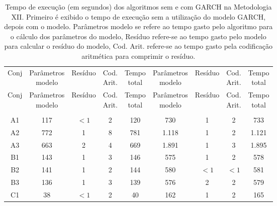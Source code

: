 \begin{center}
\begin{longtable}{ccccc|cccc}
\toprule
\rowcolor{white}
\caption[Metodologia XII: tempo de execução]{Tempo de execução (em segundos)
dos algoritmos sem e com GARCH na Metodologia XII. Primeiro é exibido o tempo de
execução sem a utilização do modelo GARCH, depois com o modelo. Parâmetros
modelo se refere ao tempo gasto pelo algoritmo para o cálculo dos parâmetros do
modelo, Resíduo refere-se ao tempo gasto pelo modelo para calcular o resíduo do
modelo, Cod. Arit. refere-se ao tempo gasto pela codificação aritmética para
comprimir o resíduo.} \label{tab:EvolucaoEntropiaMet12}\\
\midrule
Conj & \specialcell{Parâmetros\\modelo} &
Resíduo & \specialcell{Cod.\\Arit.} & \specialcell{Tempo\\total} &
\specialcell{Parâmetros\\modelo} &
Resíduo & \specialcell{Cod.\\Arit.} & \specialcell{Tempo\\total} \\
\midrule
\endfirsthead 
\midrule
\rowcolor{white}
Conj & \specialcell{Parâmetros\\modelo} &
Resíduo & \specialcell{Cod.\\Arit.} & \specialcell{Tempo\\total} &
\specialcell{Parâmetros\\modelo} &
Resíduo & \specialcell{Cod.\\Arit.} & \specialcell{Tempo\\total} \\
\toprule
\endhead
\midrule \\ %
\endfoot
\bottomrule 
\endlastfoot
A1&117&$<1$&2&120&730&1&2&733\\
A2&772&1&8&781&1.118&1&2&1.121\\
A3&663&2&4&669&1.891&1&3&1.895\\
B1&143&1&3&146&575&1&2&578\\
B2&141&1&2&144&580&$<1$&$<1$&581\\
B3&136&1&3&139&576&2&2&579\\
C1&38&$<1$&2&40&162&1&2&165\\

\end{longtable}
\end{center}
